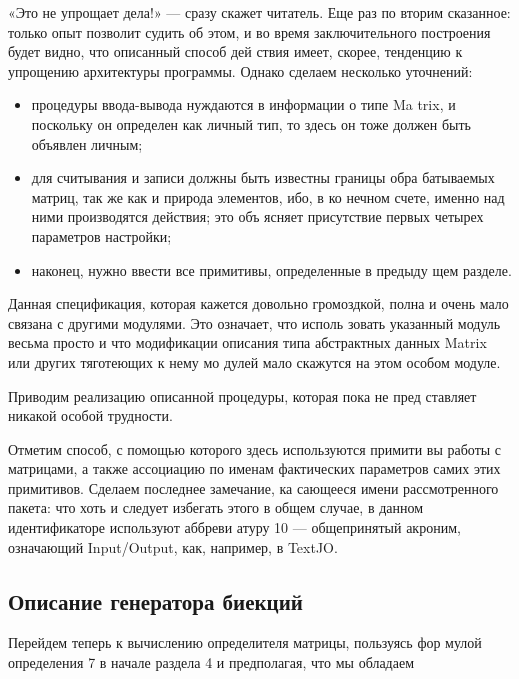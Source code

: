 \newpage
«Это не упрощает дела!» — сразу скажет читатель. Еще раз по­
вторим сказанное: только опыт позволит судить об этом, и во время
заключительного построения будет видно, что описанный способ дей­
ствия имеет, скорее, тенденцию к упрощению архитектуры программы.
Однако сделаем несколько уточнений:
\begin{itemize}
\item процедуры ввода-вывода нуждаются в информации о типе Ma­
trix, и поскольку он определен как личный тип, то здесь он тоже
должен быть объявлен личным;
\item для считывания и записи должны быть известны границы обра­
батываемых матриц, так же как и природа элементов, ибо, в ко­
нечном счете, именно над ними производятся действия; это объ­
ясняет присутствие первых четырех параметров настройки;
\item наконец, нужно ввести все примитивы, определенные в предыду­
щем разделе.
\end{itemize}

Данная спецификация, которая кажется довольно громоздкой, полна
и очень мало связана с другими модулями. Это означает, что исполь­
зовать указанный модуль весьма просто и что модификации описания
типа абстрактных данных Matrix или других тяготеющих к нему мо­
дулей мало скажутся на этом особом модуле.

\newpage

Приводим реализацию описанной процедуры, которая пока не пред­
ставляет никакой особой трудности.


Отметим способ, с помощью которого здесь используются примити­
вы работы с матрицами, а также ассоциацию по именам фактических
параметров самих этих примитивов. Сделаем последнее замечание, ка­
сающееся имени рассмотренного пакета: что хоть и следует избегать
этого в общем случае, в данном идентификаторе используют аббреви­
атуру 10 — общепринятый акроним, означающий Input/Output, как,
например, в TextJO.

\subsection{Описание генератора биекций}

Перейдем теперь к вычислению определителя матрицы, пользуясь фор­
мулой определения 7 в начале раздела 4 и предполагая, что мы обладаем

\newpage

